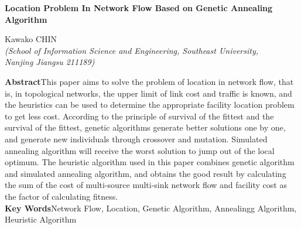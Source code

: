 \documentclass[a4paper,11pt,onecolumn,twoside]{article}
\begin{document}
\begin{center}
\parbox{\textwidth}{
	\begin{center}
	{\Large{\textbf{Location Problem In Network Flow Based on Genetic Annealing Algorithm}}}
	\end{center}

	\vspace{-0.5cm}
	
	\begin{center}
		Kawako CHIN \\[2pt]
		\scriptsize{\textit{(School of Information Science and Engineering, Southeast University,\\ Nanjing Jiangsu 211189)}}\\[2pt]
	\end{center}

	{\small{\textbf{Abstract}\quad This paper aims to solve the problem of location in network flow, that is, in topological networks, the upper limit of link cost and traffic is known, and the heuristics can be used to determine the appropriate facility location problem to get less cost. According to the principle of survival of the fittest and the survival of the fittest, genetic algorithms generate better solutions one by one, and generate new individuals through crossover and mutation. Simulated annealing algorithm will receive the worst solution to jump out of the local optimum. The heuristic algorithm used in this paper combines genetic algorithm and simulated annealing algorithm, and obtains the good result by calculating the sum of the cost of multi-source multi-sink network flow and facility cost as the factor of calculating fitness.\\
	\textbf{Key Words}\quad Network Flow, Location, Genetic Algorithm, Annealingg Algorithm, Heuristic Algorithm}}
}
\end{center}



\setlength{\oddsidemargin}{-.5cm}  %
\setlength{\evensidemargin}{\oddsidemargin}
\setlength{\textwidth}{17.00cm}
\end{document}

